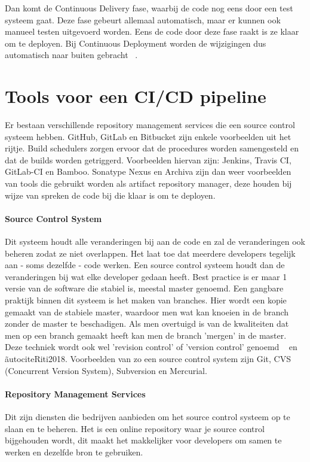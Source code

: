     Dan komt de Continuous Delivery fase, waarbij de code nog eens door een test systeem gaat. Deze fase gebeurt allemaal automatisch, maar er kunnen ook manueel testen uitgevoerd worden. Eens de code door deze fase raakt is ze klaar om te deployen. 
    Bij Continuous Deployment worden de wijzigingen dus automatisch naar buiten gebracht ~\autocite{Kramer2018}.

\section{Tools voor een CI/CD pipeline}
\label{sec:tools-voor-pipeline}
    Er bestaan verschillende repository management services die een source control systeem hebben. GitHub, GitLab en Bitbucket zijn enkele voorbeelden uit het rijtje.
    Build schedulers zorgen ervoor dat de procedures worden samengesteld en dat de builds worden getriggerd. Voorbeelden hiervan zijn: Jenkins, Travis CI, GitLab-CI en Bamboo. Sonatype Nexus en Archiva zijn dan weer voorbeelden van tools die gebruikt worden als artifact repository manager, deze houden bij wijze van spreken de code bij die klaar is om te deployen. 
    
    \paragraph{Source Control System}
    Dit systeem houdt alle veranderingen bij aan de code en zal de veranderingen ook beheren zodat ze niet overlappen. Het laat toe dat meerdere developers tegelijk aan - soms dezelfde - code werken. Een source control systeem houdt dan de veranderingen bij wat elke developer gedaan heeft. Best practice is er maar 1 versie van de software die stabiel is, meestal master genoemd. Een gangbare praktijk binnen dit systeem is het maken van branches. Hier wordt een kopie gemaakt van de stabiele master, waardoor men wat kan knoeien in de branch zonder de master te beschadigen. Als men overtuigd is van de kwaliteiten dat men op een branch gemaakt heeft kan men de branch 'mergen' in de master. Deze techniek wordt ook wel 'revision control' of 'version control' genoemd ~\autocite{Skelton2014} en ãutocite{Riti2018}.
    Voorbeelden van zo een source control system zijn Git, CVS (Concurrent Version System), Subversion en Mercurial.
    
    \paragraph{Repository Management Services}
    Dit zijn diensten die bedrijven aanbieden om het source control systeem op te slaan en te beheren.
    Het is een online repository waar je source control bijgehouden wordt, dit maakt het makkelijker voor developers om samen te werken en dezelfde bron te gebruiken.
    
